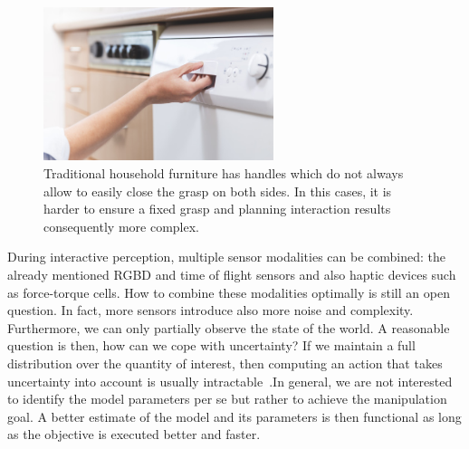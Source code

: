 \begin{figure}[h!]
    \centering
    \includegraphics[width=0.6\textwidth]{research_plan/images/dishwasher_handle.png}
    \caption{Traditional household furniture has handles which do not always allow to easily close the grasp on both sides. In this cases, it is harder to ensure a fixed grasp and planning interaction results consequently more complex.}
    \label{fig:dishwasher_handle}
\end{figure}


During interactive perception, multiple sensor modalities can be combined: the already mentioned RGBD and time of flight sensors and also haptic devices such as force-torque cells. How to combine these modalities optimally is still an open question. In fact, more sensors introduce also more noise and complexity. Furthermore, we can only partially observe the state of the world. A reasonable question is then, how can we cope with uncertainty? If we maintain a full distribution over the quantity of interest, then computing an action that takes uncertainty into account is usually intractable~\cite{lavalle2006planning}.In general, we are not interested to identify the model parameters per se but rather to achieve the manipulation goal. A better estimate of the model and its parameters is then functional as long as the objective is executed better and faster.   

